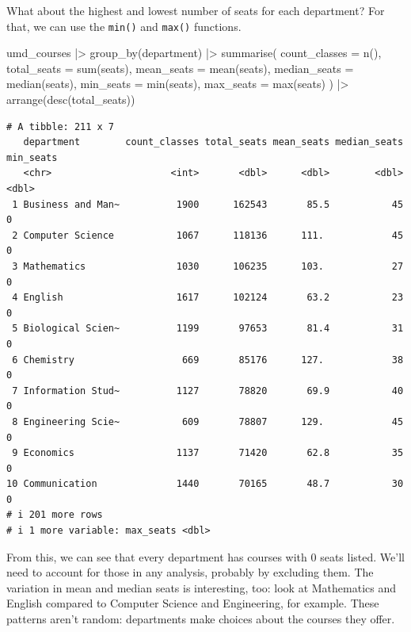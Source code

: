 \documentclass[
  letterpaper,
  DIV=11,
  numbers=noendperiod]{scrreprt}
\newenvironment{Shaded}{\begin{snugshade}}{\end{snugshade}}
\newcommand{\AttributeTok}[1]{\textcolor[rgb]{0.40,0.45,0.13}{#1}}
\newcommand{\FunctionTok}[1]{\textcolor[rgb]{0.28,0.35,0.67}{#1}}
\newcommand{\NormalTok}[1]{\textcolor[rgb]{0.00,0.23,0.31}{#1}}
\newcommand{\SpecialCharTok}[1]{\textcolor[rgb]{0.37,0.37,0.37}{#1}}
\begin{document}
What about the highest and lowest number of seats for each department?
For that, we can use the \texttt{min()} and \texttt{max()} functions.

\begin{Shaded}
\begin{Highlighting}[]
\NormalTok{umd\_courses }\SpecialCharTok{|\textgreater{}}
  \FunctionTok{group\_by}\NormalTok{(department) }\SpecialCharTok{|\textgreater{}}
  \FunctionTok{summarise}\NormalTok{(}
    \AttributeTok{count\_classes =} \FunctionTok{n}\NormalTok{(),}
    \AttributeTok{total\_seats =} \FunctionTok{sum}\NormalTok{(seats),}
    \AttributeTok{mean\_seats =} \FunctionTok{mean}\NormalTok{(seats),}
    \AttributeTok{median\_seats =} \FunctionTok{median}\NormalTok{(seats),}
    \AttributeTok{min\_seats =} \FunctionTok{min}\NormalTok{(seats),}
    \AttributeTok{max\_seats =} \FunctionTok{max}\NormalTok{(seats)}
\NormalTok{  ) }\SpecialCharTok{|\textgreater{}}
  \FunctionTok{arrange}\NormalTok{(}\FunctionTok{desc}\NormalTok{(total\_seats))}
\end{Highlighting}
\end{Shaded}

\begin{verbatim}
# A tibble: 211 x 7
   department        count_classes total_seats mean_seats median_seats min_seats
   <chr>                     <int>       <dbl>      <dbl>        <dbl>     <dbl>
 1 Business and Man~          1900      162543       85.5           45         0
 2 Computer Science           1067      118136      111.            45         0
 3 Mathematics                1030      106235      103.            27         0
 4 English                    1617      102124       63.2           23         0
 5 Biological Scien~          1199       97653       81.4           31         0
 6 Chemistry                   669       85176      127.            38         0
 7 Information Stud~          1127       78820       69.9           40         0
 8 Engineering Scie~           609       78807      129.            45         0
 9 Economics                  1137       71420       62.8           35         0
10 Communication              1440       70165       48.7           30         0
# i 201 more rows
# i 1 more variable: max_seats <dbl>
\end{verbatim}

From this, we can see that every department has courses with 0 seats
listed. We'll need to account for those in any analysis, probably by
excluding them. The variation in mean and median seats is interesting,
too: look at Mathematics and English compared to Computer Science and
Engineering, for example. These patterns aren't random: departments make
choices about the courses they offer.
\end{document}
